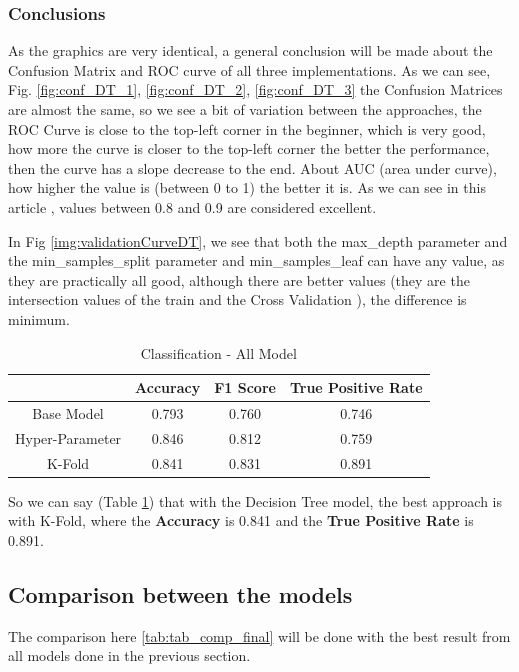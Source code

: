 \documentclass[conference]{IEEEtran}
\begin{document}
\subsubsection{Conclusions}
As the graphics are very identical, a general conclusion will be made about the Confusion Matrix and ROC curve of all three implementations. As we can see, Fig. \ref{fig:conf_DT_1}, \ref{fig:conf_DT_2}, \ref{fig:conf_DT_3} the Confusion Matrices are almost the same, so we see a bit of variation between the approaches, the ROC Curve is close to the top-left corner in the beginner, which is very good, how more the curve is closer to the top-left corner the better the performance, then the curve has a slope decrease to the end. About AUC (area under curve), how higher the value is (between 0 to 1) the better it is. As we can see in this article \cite{ROC_article}, values between 0.8 and 0.9 are considered excellent.

In Fig \ref{img:validationCurveDT}, we see that both the max\_depth parameter and the min\_samples\_split parameter and min\_samples\_leaf can have any value, as they are practically all good, although there are better values (they are the intersection values of the train and the Cross Validation ), the difference is minimum.

\begin{table}[ht!]
    \centering
    \caption{Classification - All Model} 
    \begin{tabular}{||c| c c c||} 
    \hline
     & Accuracy & F1 Score & True Positive Rate \\ [0.5ex] 
     \hline\hline
     Base Model & 0.793 & 0.760 & 0.746 \\
     \hline
    Hyper-Parameter & 0.846 & 0.812 & 0.759 \\ 
    \hline
    K-Fold & 0.841 & 0.831 & 0.891 \\ 
    \hline
    \end{tabular}
    \label{tab:tab-final-tree}
\end{table}

So we can say (Table \ref{tab:tab-final-tree}) that with the Decision Tree model, the best approach is with K-Fold, where the \textbf{Accuracy} is 0.841 and the \textbf{True Positive Rate} is 0.891.

\subsection{Comparison between the models}

The comparison here \ref{tab:tab_comp_final} will be done with the best result from all models done in the previous section.
\end{document}

